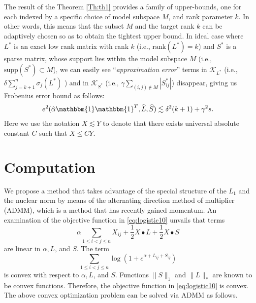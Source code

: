 \documentclass[AMS,STIX1COL]{WileyNJD-v2}
\begin{document}
{The result of the Theorem \ref{Th:th1} provides a family of upper-bounds, one for each indexed by a specific choice of model subspace $M$, and rank parameter $k$.
In other words, this means that the subset $M$ and the target rank $k$ can be adaptively chosen so as to obtain the tightest upper bound.
In ideal case where $L^*$ is an exact low rank matrix with rank $k$ \big(i.e., $\mbox{rank}(L^*)=k$\big) and $S^*$ is a sparse matrix, whose support lies within the model subspace $M$ \big(i.e., $\mbox{supp}(S^*) \subset M$\big), we can easily see ``\emph{approximation error}'' terms in $\mathcal{K}_{L^*}$ \big(i.e., $\delta\sum_{j=k+1}^{n}\sigma_j(L^*)$ \big) and in $\mathcal{K}_{S^*}$ \big(i.e., $\gamma\sum_{(i,j)\notin M}|S_{ij}^*|$\big) disappear, giving us Frobenius error bound as follows:
\[
    e^{2}(\hat{\alpha}\mathbbm{1}\mathbbm{1}^T,\widehat{L},\widehat{S}) \lesssim \delta^2(k+1)+\gamma^2s.
\]
Here we use the notation $X \lesssim Y$ to denote that there exists universal absolute constant $C$ such that $X \leq CY$.


\section{Computation}
\label{sec:compute}

We propose a method that takes advantage of the special structure
of the $L_1$ and the nuclear norm by means of the
alternating direction method of multiplier (ADMM), which is a method
that has recently gained momentum.
An examination of the objective function in \eqref{eq:logistic10} unvails that
terms
\[
\alpha \sum_{1\le i< j\le n}X_{ij} +\frac{1}{2} X \bullet L +\frac{1}{2} X \bullet S
\]
are linear in $\alpha,  L$, and $S$.
The term
\[
\sum_{1\le i<j\le n} \log \left(1 + e^{\alpha + L_{ij} +S_{ij}}\right)
\]
is convex with respect to $\alpha,  L$, and $S$.
Functions $\|S\|_1$ and $\|L\|_\ast$ are known to be convex functions.
Therefore, the objective function in \eqref{eq:logistic10} is convex.
The above convex optimization problem can be solved via ADMM as follows.


}
\end{document}
